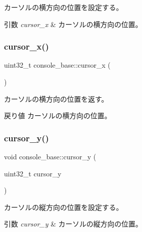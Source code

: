 カーソルの横方向の位置を設定する。 
\begin{DoxyParams}{引数}
{\em cursor\+\_\+x} & カーソルの横方向の位置。 \\
\hline
\end{DoxyParams}
\hypertarget{classconsole__base_ad59a91b66625ce8c248932772354383f}{}\label{classconsole__base_ad59a91b66625ce8c248932772354383f} 
\subsubsection{\texorpdfstring{cursor\+\_\+x()}{cursor\_x()}\hspace{0.1cm}{\footnotesize\ttfamily [2/2]}}
{\footnotesize\ttfamily uint32\+\_\+t console\+\_\+base\+::cursor\+\_\+x (\begin{DoxyParamCaption}{ }\end{DoxyParamCaption})}

カーソルの横方向の位置を返す。 \begin{DoxyReturn}{戻り値}
カーソルの横方向の位置。 
\end{DoxyReturn}
\hypertarget{classconsole__base_aba47a7cadd9a68dc6f7a98c6a3080a72}{}\label{classconsole__base_aba47a7cadd9a68dc6f7a98c6a3080a72} 
\subsubsection{\texorpdfstring{cursor\+\_\+y()}{cursor\_y()}\hspace{0.1cm}{\footnotesize\ttfamily [1/2]}}
{\footnotesize\ttfamily void console\+\_\+base\+::cursor\+\_\+y (\begin{DoxyParamCaption}\item[{uint32\+\_\+t}]{cursor\+\_\+y }\end{DoxyParamCaption})}

カーソルの縦方向の位置を設定する。 
\begin{DoxyParams}{引数}
{\em cursor\+\_\+y} & カーソルの縦方向の位置。 \\
\hline
\end{DoxyParams}
\hypertarget{classconsole__base_a6182707c71b93d9e94a621bb81856141}{}\label{classconsole__base_a6182707c71b93d9e94a621bb81856141} 
